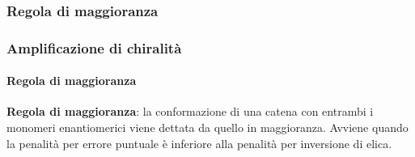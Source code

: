 \subsubsection{Regola di maggioranza}\begin{frame}\frametitle{Amplificazione di chiralità}\framesubtitle{Regola di maggioranza}
{\bf Regola di maggioranza}: la conformazione di una catena con entrambi i monomeri enantiomerici viene dettata da quello in maggioranza. Avviene quando la penalità per errore puntuale 
 è inferiore alla penalità per inversione di elica.

\begin{figure}{}\end{figure}
\end{frame}

